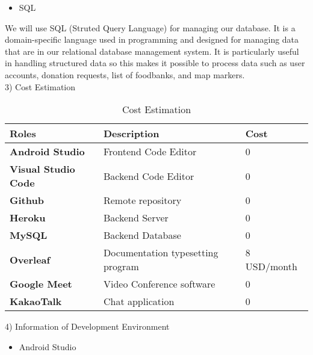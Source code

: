 \documentclass[conference]{IEEEtran}
\begin{document}
\begin{itemize}
\item SQL\\
\end{itemize}
\par We will use SQL (Struted Query Language) for managing our database.  It is a domain-specific language used in programming and designed for managing data that are in our relational database management system. It is particularly useful in handling structured data so this makes it possible to process data such as user accounts, donation requests, list of foodbanks, and map markers.\\

3) Cost Estimation

\begin{table}[htbp]
\caption{Cost Estimation}
\begin{center}
\begin{tabular}{ | m{5em} | m{4cm}| m{2cm} | } 
  \hline
 \textbf{Roles}& \textbf{Description} & \textbf{Cost} \\
\hline
  \textbf{Android Studio} & Frontend Code Editor & 0\\
  \hline
  \textbf{Visual Studio Code} &  Backend Code Editor & 0	\\
  \hline
  \textbf{Github} & Remote repository& 0\\ 
  \hline
  \textbf{Heroku} & Backend Server & 0	\\
  \hline
  \textbf{MySQL} & Backend Database & 0	\\
  \hline
  \textbf{Overleaf} & Documentation typesetting program & 8 USD/month\\
  \hline
  \textbf{Google Meet} &Video Conference software& 0	\\
  \hline
  \textbf{KakaoTalk} &Chat application& 0	\\
  \hline
\end{tabular}
\end{center}
\end{table}

4) Information of Development Environment\\
\begin{itemize}
\item Android Studio
\end{itemize}
\end{document}
